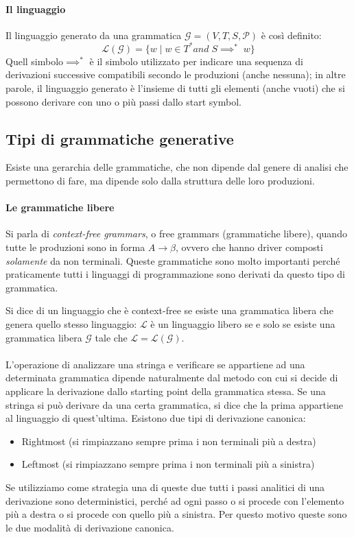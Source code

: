 \documentclass[class=book, crop=false, oneside, 12pt]{standalone}
\begin{document}
\paragraph{Il linguaggio}
Il linguaggio generato da una grammatica \(\mathcal{G} = (V,T,S,\mathcal{P})\) è così definito:
\begin{equation}
    \mathcal{L}(\mathcal{G}) = \{w \mid w \in T^* and \; S \implies^*\;  w\}
\end{equation}
Quell simbolo\( \implies^*\) è il simbolo utilizzato per indicare una sequenza di derivazioni successive compatibili secondo le produzioni (anche nessuna); in altre parole, il linguaggio generato è l'insieme di tutti gli elementi (anche vuoti) che si possono derivare con uno o più passi dallo start symbol. 

\subsection{Tipi di grammatiche generative}
Esiste una gerarchia delle grammatiche, che non dipende dal genere di analisi che permettono di fare, ma dipende solo dalla struttura delle loro produzioni.

\paragraph{Le grammatiche libere}
Si parla di \emph{context-free grammars}, o free grammars (grammatiche libere), quando tutte le produzioni sono in forma \(A \to \beta\), ovvero che hanno driver composti \emph{solamente} da non terminali. Queste grammatiche sono molto importanti perché praticamente tutti i linguaggi di programmazione sono derivati da questo tipo di grammatica.

Si dice di un linguaggio che è context-free se esiste una grammatica libera che genera quello stesso linguaggio: \(\mathcal{L}\) è un linguaggio libero se e solo se esiste una grammatica libera \(\mathcal{G}\) tale che \(\mathcal{L}=\mathcal{L}(\mathcal{G})\).

\paragraph{}
L’operazione di analizzare una stringa e verificare se appartiene ad una determinata grammatica dipende naturalmente dal metodo con cui si decide di applicare la derivazione dallo starting point della grammatica stessa. Se una stringa si può derivare da una certa grammatica, si dice che la prima appartiene al linguaggio di quest'ultima.
Esistono due tipi di derivazione canonica:
\begin{itemize}
    \item Rightmost (si rimpiazzano sempre prima i non terminali più a destra)
    \item Leftmost (si rimpiazzano sempre prima i non terminali più a sinistra)
\end{itemize}
Se utilizziamo come strategia una di queste due tutti i passi analitici di una derivazione sono deterministici, perché ad ogni passo o si procede con l’elemento più a destra o si procede con quello più a sinistra. Per questo motivo queste sono le due modalità di derivazione canonica.
\end{document}

